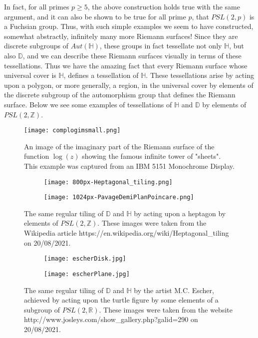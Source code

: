 \documentclass[11pt]{report}
\theoremstyle{definition}
\begin{document}
In fact, for all primes $p \geq 5$, the above construction holds true with the same argument, and it can also be shown to be true for all prime $p$, that $PSL(2,p)$ is a Fuchsian group. Thus, with such simple examples we seem to have constructed, somewhat abstractly, infinitely many more Riemann surfaces! Since they are discrete subgroups of $Aut(\mathbb{H})$, these groups in fact tessellate not only $\mathbb{H}$, but also $\mathbb{D}$, and we can describe these Riemann surfaces visually in terms of these tessellations. Thus we have the amazing fact that every Riemann surface whose universal cover is $\mathbb{H}$, defines a tessellation of $\mathbb{H}$. These tessellations arise by acting upon a polygon, or more generally, a region, in the universal cover by elements of the discrete subgroup of the automorphism group that defines the Riemann surface. Below we see some examples of tessellations of $\mathbb{H}$ and $\mathbb{D}$ by elements of $PSL(2,\mathbb{Z})$.
\FloatBarrier
\begin{figure*}[ht!]
  \centering
  \texttt{[image: complogimsmall.png]}
  \captionsetup{labelformat=empty}
  \caption*{An image of the imaginary part of the Riemann surface of the function $\log(z)$ showing the famous infinite tower of "sheets". This example was captured from an IBM 5151 Monochrome Display.}
\end{figure*}
\FloatBarrier
\begin{figure*}[ht!]
  \begin{subfigure}[h]{0.3\textwidth}
    \centering
    \texttt{[image: 800px-Heptagonal\_tiling.png]}
  \end{subfigure}
  \hfill
  \begin{subfigure}[h]{0.3\textwidth}
    \centering
    \texttt{[image: 1024px-PavageDemiPlanPoincare.png]}
  \end{subfigure}
  \hfill
  \captionsetup{labelformat=empty}
  \caption{The same regular tiling of $\mathbb{D}$ and $\mathbb{H}$ by acting upon a heptagon by elements of $PSL(2,\mathbb{Z})$. These images were taken from the Wikipedia article https://en.wikipedia.org/wiki/Heptagonal\_tiling on 20/08/2021.}
\end{figure*}
\FloatBarrier
\vspace*{20pt}
\begin{figure*}[ht!]
  \begin{subfigure}[b]{0.3\textwidth}
    \centering
    \texttt{[image: escherDisk.jpg]}
  \end{subfigure}
  \hfill
  \begin{subfigure}[b]{0.4\textwidth}
    \centering
    \texttt{[image: escherPlane.jpg]}
  \end{subfigure}
  \captionsetup{labelformat=empty}
  \caption{The same regular tiling of $\mathbb{D}$ and $\mathbb{H}$ by the artist M.C. Escher, achieved by acting upon the turtle figure by some elements of a subgroup of $PSL(2,\mathbb{R})$. These images were taken from the website http://www.josleys.com/show\_gallery.php?galid=290 on 20/08/2021.}
\end{figure*}
\end{document}
